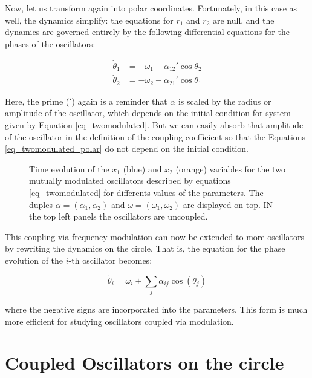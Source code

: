 \documentclass{article}
\begin{document}
Now, let us transform again into polar coordinates. 
Fortunately, in this case as well, the dynamics simplify: the equations for $\dot{r}_1$ and $\dot{r}_2$ are null, and the dynamics are governed entirely by the following differential equations for the phases of the oscillators:

\begin{subequations}  \label{eq_twomodulated_polar}
\begin{align}
    \dot{\theta}_1 & = -\omega_1  - \alpha_{12}' \cos{\theta}_2 \\
    \dot{\theta}_2 & = -\omega_2  - \alpha_{21}' \cos{\theta}_1
\end{align}
\end{subequations}

Here, the prime ($'$) again is a reminder that $\alpha$ is scaled by the radius or amplitude of the oscillator, which depends on the initial condition for system given by Equation \ref{eq_twomodulated}. 
But we can easily absorb that amplitude of the oscillator in the definition of the coupling coefficient so that the Equations \ref{eq_twomodulated_polar} do not depend on the initial condition.



\begin{figure} [h]
    \centerline{}
    \caption{Time evolution of the $x_1$ (blue) and $x_2$  (orange) variables for the two mutually modulated oscillators described by equations \ref{eq_twomodulated} for differents values of the parameters. The duples $\alpha=(\alpha_1,\alpha_2)$ and $\omega=(\omega_1,\omega_2)$ are 
    displayed on top. IN the top left panels the oscillators are uncoupled.}
    \label{fig_twomodulated}
\end{figure}

This coupling via frequency modulation can now be extended to more oscillators by rewriting the dynamics on the circle. That is, the equation for the phase evolution of the $i$-th oscillator becomes:

\begin{equation} \label{eq_nmodulated}
    \dot{\theta}_i = \omega_i + \sum_j \alpha_{ij} \cos({\theta_j})
\end{equation}

where the negative signs are incorporated into the parameters. This form is much more efficient for studying oscillators coupled via modulation.



\section{Coupled Oscillators on the circle}
\end{document}
